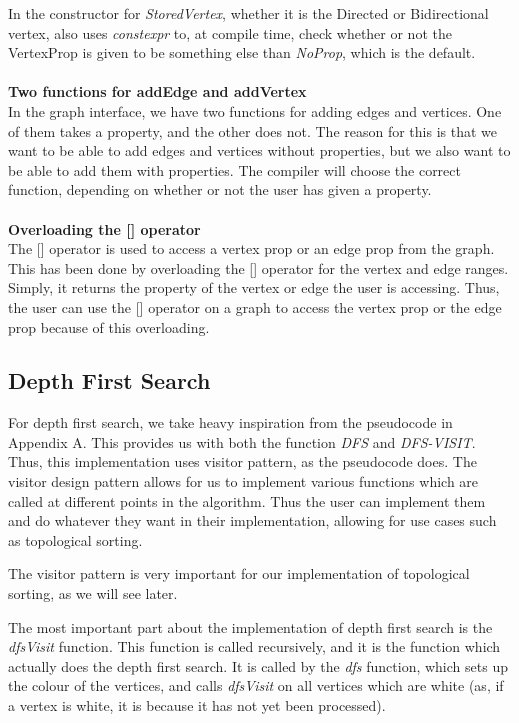 \documentclass{article}
\begin{document}
\noindent
In the constructor for \textit{StoredVertex}, whether it is the Directed or Bidirectional vertex, also uses \textit{constexpr} to, at compile time, check whether or not the VertexProp is given to be something else than \textit{NoProp}, which is the default. 
\\\\
\noindent
\textbf{Two functions for addEdge and addVertex}\\
\noindent
In the graph interface, we have two functions for adding edges and vertices. One of them takes a property, and the other does not.
The reason for this is that we want to be able to add edges and vertices without properties, but we also want to be able to add them with properties.
The compiler will choose the correct function, depending on whether or not the user has given a property.
\\\\
\noindent
\textbf{Overloading the [] operator}\\
\noindent
The [] operator is used to access a vertex prop or an edge prop from the graph.
This has been done by overloading the [] operator for the vertex and edge ranges.
Simply, it returns the property of the vertex or edge the user is accessing.
Thus, the user can use the [] operator on a graph to access the vertex prop or 
the edge prop because of this overloading.

\subsection{Depth First Search}
For depth first search, we take heavy inspiration from the pseudocode in Appendix A.
This provides us with both the function \textit{DFS} and \textit{DFS-VISIT}. 
Thus, this implementation uses visitor pattern, as the pseudocode does. 
The visitor design pattern allows for us to implement various functions 
which are called at different points in the algorithm. Thus the user can implement them and 
do whatever they want in their implementation, allowing for use cases such as topological sorting.

The visitor pattern is very important for our implementation of topological
sorting, as we will see later.

The most important part about the implementation of depth first search is
the \textit{dfsVisit} function. This function is called recursively, and
it is the function which actually does the depth first search. It is called
by the \textit{dfs} function, which sets up the colour of the vertices, and
calls \textit{dfsVisit} on all vertices which are white (as, if a vertex is 
white, it is because it has not yet been processed).
\end{document}
